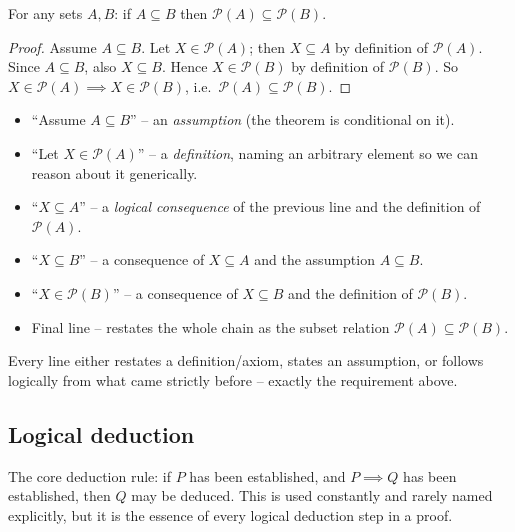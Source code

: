 \begin{example}
For any sets $A, B$: if $A \subseteq B$ then $\mathcal{P}(A) \subseteq \mathcal{P}(B)$.
\end{example}
\begin{proof}
Assume $A \subseteq B$. Let $X \in \mathcal{P}(A)$; then $X \subseteq A$ by definition of $\mathcal{P}(A)$. Since $A \subseteq B$, also $X \subseteq B$. Hence $X \in \mathcal{P}(B)$ by definition of $\mathcal{P}(B)$. So $X \in \mathcal{P}(A) \implies X \in \mathcal{P}(B)$, i.e.\ $\mathcal{P}(A) \subseteq \mathcal{P}(B)$.
\end{proof}

\begin{note}
\begin{itemize}
    \item ``Assume $A\subseteq B$'' -- an \emph{assumption} (the theorem is conditional on it).
    \item ``Let $X \in \mathcal{P}(A)$'' -- a \emph{definition}, naming an arbitrary element so we can reason about it generically.
    \item ``$X \subseteq A$'' -- a \emph{logical consequence} of the previous line and the definition of $\mathcal{P}(A)$.
    \item ``$X \subseteq B$'' -- a consequence of $X\subseteq A$ and the assumption $A \subseteq B$.
    \item ``$X \in \mathcal{P}(B)$'' -- a consequence of $X \subseteq B$ and the definition of $\mathcal{P}(B)$.
    \item Final line -- restates the whole chain as the subset relation $\mathcal{P}(A)\subseteq\mathcal{P}(B)$.
\end{itemize}
Every line either restates a definition/axiom, states an assumption, or follows logically from what came strictly before -- exactly the requirement above.
\end{note}

\subsection{Logical deduction}
\label{sec:3-2}

\begin{note}
The core deduction rule: if $P$ has been established, and $P \implies Q$ has been established, then $Q$ may be deduced. This is used constantly and rarely named explicitly, but it is the essence of every logical deduction step in a proof.
\end{note}

